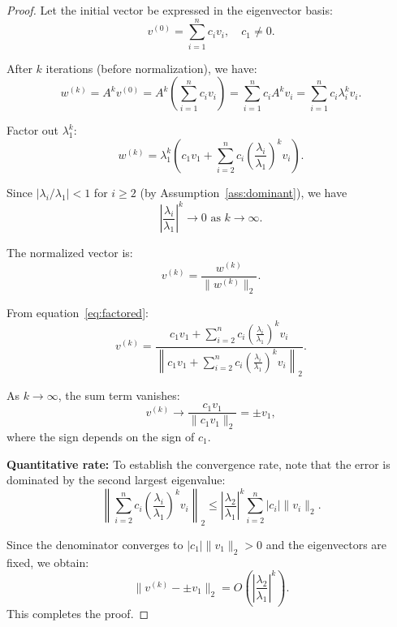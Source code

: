 \documentclass[11pt,a4paper]{article}
\begin{document}
\begin{proof}
Let the initial vector be expressed in the eigenvector basis:
\begin{equation}
v^{(0)} = \sum_{i=1}^n c_i v_i, \quad c_1 \neq 0.
\end{equation}

After $k$ iterations (before normalization), we have:
\begin{equation}
w^{(k)} = A^k v^{(0)} = A^k \left(\sum_{i=1}^n c_i v_i\right) = \sum_{i=1}^n c_i A^k v_i = \sum_{i=1}^n c_i \lambda_i^k v_i.
\end{equation}

Factor out $\lambda_1^k$:
\begin{equation}\label{eq:factored}
w^{(k)} = \lambda_1^k \left(c_1 v_1 + \sum_{i=2}^n c_i \left(\frac{\lambda_i}{\lambda_1}\right)^k v_i\right).
\end{equation}

Since $|\lambda_i/\lambda_1| < 1$ for $i \geq 2$ (by Assumption~\ref{ass:dominant}), we have
\begin{equation}
\left|\frac{\lambda_i}{\lambda_1}\right|^k \to 0 \text{ as } k \to \infty.
\end{equation}

The normalized vector is:
\begin{equation}
v^{(k)} = \frac{w^{(k)}}{\|w^{(k)}\|_2}.
\end{equation}

From equation~\eqref{eq:factored}:
\begin{equation}
v^{(k)} = \frac{c_1 v_1 + \sum_{i=2}^n c_i \left(\frac{\lambda_i}{\lambda_1}\right)^k v_i}{\left\|c_1 v_1 + \sum_{i=2}^n c_i \left(\frac{\lambda_i}{\lambda_1}\right)^k v_i\right\|_2}.
\end{equation}

As $k \to \infty$, the sum term vanishes:
\begin{equation}
v^{(k)} \to \frac{c_1 v_1}{\|c_1 v_1\|_2} = \pm v_1,
\end{equation}
where the sign depends on the sign of $c_1$.

\textbf{Quantitative rate:} To establish the convergence rate, note that the error is dominated by the second largest eigenvalue:
\begin{equation}
\left\|\sum_{i=2}^n c_i \left(\frac{\lambda_i}{\lambda_1}\right)^k v_i\right\|_2 \leq \left|\frac{\lambda_2}{\lambda_1}\right|^k \sum_{i=2}^n |c_i| \|v_i\|_2.
\end{equation}

Since the denominator converges to $|c_1| \|v_1\|_2 > 0$ and the eigenvectors are fixed, we obtain:
\begin{equation}
\|v^{(k)} - \pm v_1\|_2 = O\left(\left|\frac{\lambda_2}{\lambda_1}\right|^k\right).
\end{equation}
This completes the proof.
\end{proof}
\end{document}
